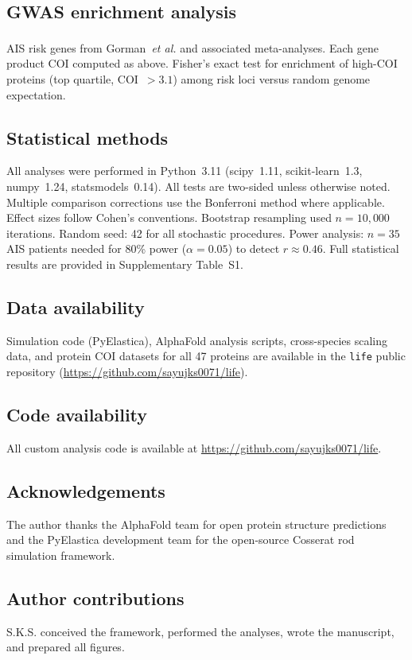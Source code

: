 \documentclass[12pt]{article}
\begin{document}
\subsection*{GWAS enrichment analysis}
AIS risk genes from Gorman~\textit{et al.}\textsuperscript{\cite{gorman2022}} and associated meta-analyses. Each gene product COI computed as above. Fisher's exact test for enrichment of high-COI proteins (top quartile, COI~$> 3.1$) among risk loci versus random genome expectation.

\subsection*{Statistical methods}
All analyses were performed in Python~3.11 (scipy~1.11, scikit-learn~1.3, numpy~1.24, statsmodels~0.14). All tests are two-sided unless otherwise noted. Multiple comparison corrections use the Bonferroni method where applicable. Effect sizes follow Cohen's conventions. Bootstrap resampling used $n = 10{,}000$ iterations. Random seed: 42 for all stochastic procedures. Power analysis: $n = 35$ AIS patients needed for 80\% power ($\alpha = 0.05$) to detect $r \approx 0.46$. Full statistical results are provided in Supplementary Table~S1.

\subsection*{Data availability}
Simulation code (PyElastica), AlphaFold analysis scripts, cross-species scaling data, and protein COI datasets for all 47 proteins are available in the \texttt{life} public repository (\url{https://github.com/sayujks0071/life}).

\subsection*{Code availability}
All custom analysis code is available at \url{https://github.com/sayujks0071/life}.

\subsection*{Acknowledgements}
The author thanks the AlphaFold team for open protein structure predictions and the PyElastica development team for the open-source Cosserat rod simulation framework.

\subsection*{Author contributions}
S.K.S. conceived the framework, performed the analyses, wrote the manuscript, and prepared all figures.
\end{document}
